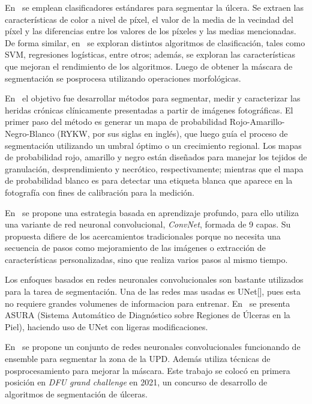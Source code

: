 En~\cite{seixas2015pattern} se emplean clasificadores estándares para segmentar la úlcera. Se extraen las características de color a nivel de píxel, el valor de la media de la vecindad del píxel y las diferencias entre los valores de los píxeles y las medias mencionadas. De forma similar, en~\cite{heras2022diabetic} se exploran distintos algoritmos de clasificación, tales como SVM, regresiones logísticas, entre otros; además, se exploran las características que mejoran el rendimiento de los algoritmos.  Luego de obtener la máscara de segmentación se posprocesa utilizando operaciones morfológicas.

En~\cite{malian2004medphos} el objetivo fue desarrollar métodos para segmentar, medir y caracterizar las heridas crónicas clínicamente presentadas a partir de imágenes fotográficas. El primer paso del método es generar un mapa de probabilidad Rojo-Amarillo-Negro-Blanco (RYKW, por sus siglas en inglés), que luego guía el proceso de segmentación utilizando un umbral óptimo o un crecimiento regional. Los mapas de probabilidad rojo, amarillo y negro están diseñados para manejar los tejidos de granulación, desprendimiento y necrótico, respectivamente; mientras que el mapa de probabilidad blanco es para detectar una etiqueta blanca que aparece en la fotografía con fines de calibración para la medición.

En~\cite{wang2015unified} se propone una estrategia basada en aprendizaje profundo, para ello utiliza una variante de red neuronal convolucional, \textit{ConvNet}, formada de 9 capas. Su propuesta difiere de los acercamientos tradicionales porque no necesita una secuencia de pasos como mejoramiento de las imágenes o extracción de características personalizadas, sino que realiza varios pasos al mismo tiempo.

Los enfoques basados en redes neuronales convolucionales son bastante utilizados para la tarea de segmentación. Una de las redes mas usadas es UNet[], pues esta no requiere grandes volumenes de informacion para entrenar. En~\cite{chino2020segmenting} se presenta ASURA (Sistema Automático de Diagnóstico sobre Regiones de Úlceras en la Piel), haciendo uso de UNet con ligeras modificaciones.

En~\cite{mahbod2021automatic} se propone un conjunto de redes neuronales convolucionales funcionando de ensemble para segmentar la zona de la UPD. Además utiliza técnicas de posprocesamiento para mejorar la máscara. Este trabajo se colocó en primera posición en \textit{DFU grand challenge} en 2021, un concurso de desarrollo de algoritmos de segmentación de úlceras.

